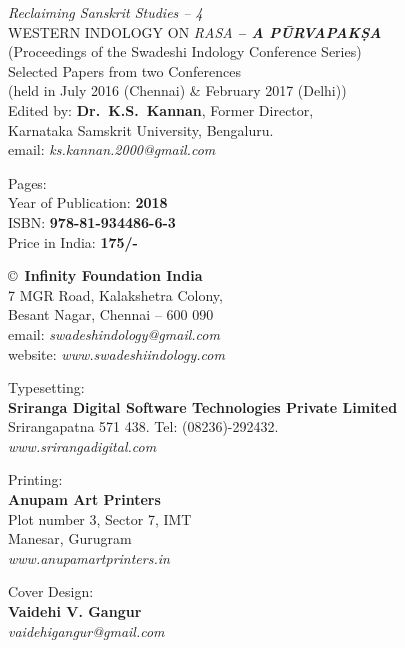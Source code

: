 \thispagestyle{empty}

\noindent
{\fontsize{9}{11}\selectfont\sl Reclaiming Sanskrit Studies -- 4}\\
WESTERN INDOLOGY ON {\sl RASA} {\sl\bfseries -- A PŪRVAPAKṢA}\\
(Proceedings of the Swadeshi Indology Conference Series)\\
Selected Papers from two Conferences\\ 
(held in July 2016 (Chennai) \& February 2017 (Delhi))\\
Edited by: {\bf Dr.\ K.S.\ Kannan}, Former Director,\\ 
Karnataka Samskrit University, Bengaluru.\\
email: {\sl ks.kannan.2000@gmail.com}
\vfill

\noindent
Pages: {\bf\pageref{bookend}}\\
Year of Publication: {\bf 2018}\\
ISBN: {\bf 978-81-934486-6-3}\\
Price in India: {\bf 175/-}
\vfill

\noindent
\copyright\ {\bf Infinity Foundation India}\\ 
7 MGR Road, Kalakshetra Colony,\\ 
Besant Nagar, Chennai -- 600 090\\
email: {\sl swadeshindology@gmail.com}\\
website: {\sl www.swadeshiindology.com} 
\vfill

\noindent
Typesetting:\\ 
{\bf Sriranga Digital Software Technologies Private Limited}\\ 
Srirangapatna 571 438. Tel: (08236)-292432.\\
{\sl www.srirangadigital.com}
\vfill

\noindent
Printing:\\
{\bf Anupam Art Printers}\\
Plot number 3, Sector 7, IMT\\
Manesar, Gurugram\\
{\sl www.anupamartprinters.in}
\noindent

\bigskip

Cover Design:\\ 
{\bf Vaidehi V. Gangur}\\
{\sl vaidehigangur@gmail.com}
